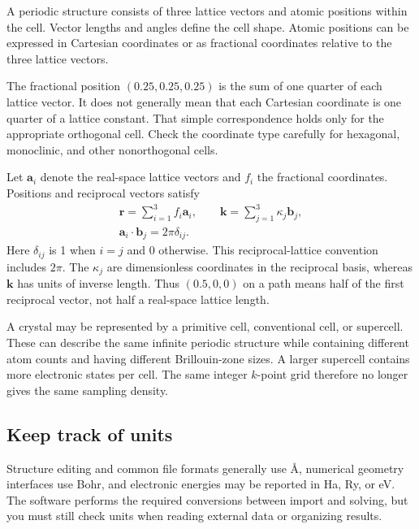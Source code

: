 A periodic structure consists of three lattice vectors and atomic positions within the cell. Vector lengths and angles define the cell shape. Atomic positions can be expressed in Cartesian coordinates or as fractional coordinates relative to the three lattice vectors.

The fractional position $(0.25,0.25,0.25)$ is the sum of one quarter of each lattice vector. It does not generally mean that each Cartesian coordinate is one quarter of a lattice constant. That simple correspondence holds only for the appropriate orthogonal cell. Check the coordinate type carefully for hexagonal, monoclinic, and other nonorthogonal cells.

Let $\mathbf a_i$ denote the real-space lattice vectors and $f_i$ the fractional coordinates. Positions and reciprocal vectors satisfy
\begin{equation}
  \begin{gathered}
  \mathbf r=\sum_{i=1}^{3}f_i\mathbf a_i,
  \qquad \mathbf k=\sum_{j=1}^{3}\kappa_j\mathbf b_j,\\
  \mathbf a_i\!\cdot\!\mathbf b_j=2\pi\delta_{ij}.
  \end{gathered}
  \label{eq:reciprocal-convention}
\end{equation}
Here $\delta_{ij}$ is 1 when $i=j$ and 0 otherwise. This reciprocal-lattice convention includes $2\pi$. The $\kappa_j$ are dimensionless coordinates in the reciprocal basis, whereas $\mathbf k$ has units of inverse length. Thus $(0.5,0,0)$ on a path means half of the first reciprocal vector, not half a real-space lattice length.

A crystal may be represented by a primitive cell, conventional cell, or supercell. These can describe the same infinite periodic structure while containing different atom counts and having different Brillouin-zone sizes. A larger supercell contains more electronic states per cell. The same integer $k$-point grid therefore no longer gives the same sampling density.

\subsection{Keep track of units}

Structure editing and common file formats generally use Å, numerical geometry interfaces use Bohr, and electronic energies may be reported in Ha, Ry, or eV. The software performs the required conversions between import and solving, but you must still check units when reading external data or organizing results.

